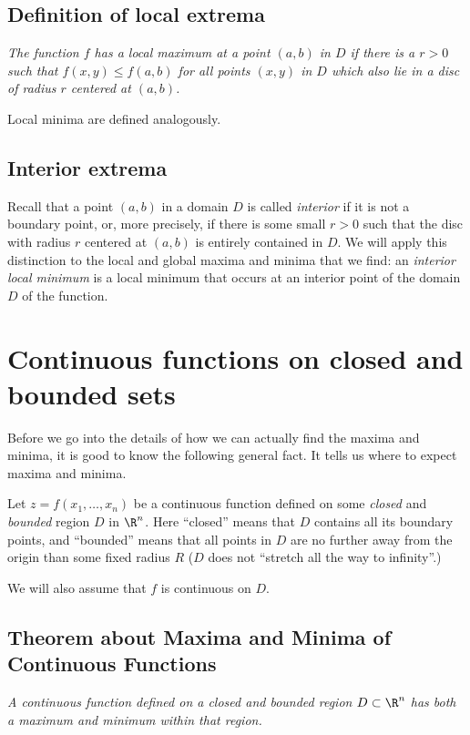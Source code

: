 \subsection{Definition of local extrema}     

\label{sec:def-local-extrema}\itshape 
The function $f$ has a \emph{local maximum} at a point $(a,b)$ in $D$ if there
is a $r>0$ such that $f(x,y)\leq f(a,b)$ for all points $(x,y)$ in $D$ which
also lie in a disc of radius $r$ centered at $(a,b)$.  \upshape

Local minima are defined analogously.

\subsection{Interior extrema}     

\label{sec:interior-extrema} 
Recall that a point $(a,b)$ in a domain $D$ is called \emph{interior} if it is
not a boundary point, or, more precisely, if there is some small $r>0$ such that
the disc with radius $r$ centered at $(a,b)$ is entirely contained in $D$.  We
will apply this distinction to the local and global maxima and minima that we
find: an \emph{interior local minimum} is a local minimum that occurs at an
interior point of the domain $D$ of the function.


\section{Continuous functions on closed and bounded sets}     
Before we go into the details of how we can actually find the maxima and minima,
it is good to know the following general fact. It tells us where to expect
maxima and minima.

Let $z=f(x_1,\ldots,x_n)$ be a continuous function defined on some \emph{closed} and
\emph{bounded} region $D$ in $\R^n$.  Here ``closed'' means that $D$ contains all its
boundary points, and ``bounded'' means that all points in $D$ are no further away
from the origin than some fixed radius $R$ ($D$ does not ``stretch all the way to
infinity''.)

We will also assume that $f$ is continuous on $D$.

\subsection{Theorem about Maxima and Minima of Continuous Functions}     
\label{thm:maxmin-exist}%
\itshape%
A continuous function defined on a closed and bounded region $D\subset \R^n$ has
both a maximum and minimum within that region.  \upshape

